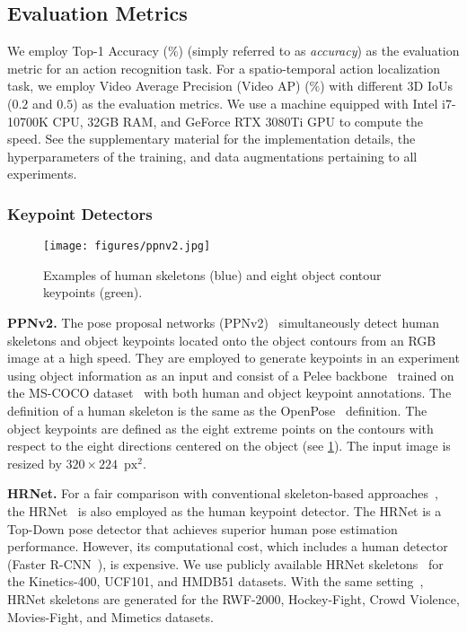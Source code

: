 \documentclass[10pt,twocolumn,letterpaper]{article}
\begin{document}
\subsection{Evaluation Metrics}
We employ Top-1 Accuracy ($\%$) (simply referred to as {\it accuracy}) as the evaluation metric for an action recognition task.
For a spatio-temporal action localization task, we employ Video Average Precision (Video AP) ($\%$) with different 3D IoUs ($0.2$ and $0.5$) as the evaluation metrics.
We use a machine equipped with Intel i7-10700K CPU, 32GB RAM, and GeForce RTX 3080Ti GPU to compute the speed.
See the supplementary material for the implementation details, the hyperparameters of the training, and data augmentations pertaining to all experiments.

\subsubsection{Keypoint Detectors}
\label{sec:keypoint_estimator}

\begin{figure}[tb]
  \centering
  \texttt{[image: figures/ppnv2.jpg]}
  \caption{Examples of human skeletons (blue) and eight object contour keypoints (green).}
  \label{fig:ppnv2}
\end{figure}

\noindent \textbf{PPNv2.} The pose proposal networks (PPNv2)~\cite{Sekii2018ECCV, PPNv2} simultaneously detect human skeletons and object keypoints located onto the object contours from an RGB image at a high speed.
They are employed to generate keypoints in an experiment using object information as an input and consist of a Pelee backbone~\cite{Wang2018Neurips} trained on the MS-COCO dataset~\cite{Lin2014ECCV} with both human and object keypoint annotations.
The definition of a human skeleton is the same as the OpenPose~\cite{Cao2017CVPR} definition.
The object keypoints are defined as the eight extreme points on the contours with respect to the eight directions centered on the object (see \cref{fig:ppnv2}).
The input image is resized by $320 \times 224$~$\text{px}^2$.

\noindent \textbf{HRNet.} For a fair comparison with conventional skeleton-based approaches~\cite{Su2020ECCV,Liu2020CVPR,Moon2021CVPR,Duan2022CVPR}, the HRNet~\cite{Sun2019CVPR} is also employed as the human keypoint detector.
The HRNet is a Top-Down pose detector that achieves superior human pose estimation performance.
However, its computational cost, which includes a human detector (Faster R-CNN~\cite{Ren2015Neurips}), is expensive.
We use publicly available HRNet skeletons~\cite{Duan2022CVPR} for the Kinetics-400, UCF101, and HMDB51 datasets.
With the same setting~\cite{Duan2022CVPR}, HRNet skeletons are generated for the RWF-2000, Hockey-Fight, Crowd Violence, Movies-Fight, and Mimetics datasets.
\end{document}

